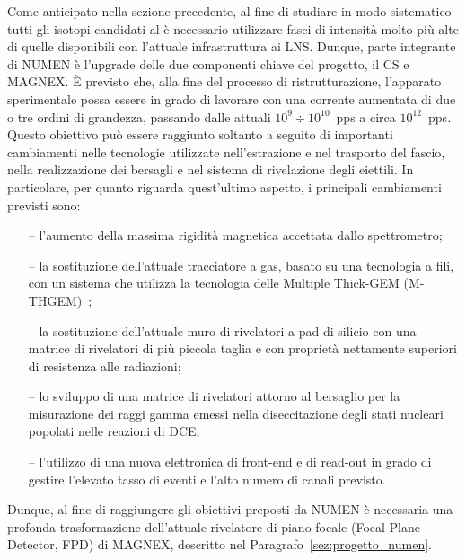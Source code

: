 Come anticipato nella sezione precedente, al fine di studiare in modo sistematico tutti gli isotopi candidati al \doppiobeta{} è necessario utilizzare fasci di intensità molto più alte di quelle disponibili con l'attuale infrastruttura ai LNS. Dunque, parte integrante di NUMEN è l'upgrade delle due componenti chiave del progetto, il CS e MAGNEX. 
È previsto che, alla fine del processo di ristrutturazione, l'apparato sperimentale possa essere in grado di lavorare con una corrente aumentata di due o tre ordini di grandezza, passando dalle attuali $10^{9} \div 10^{10}$~pps a circa $10^{12}$~pps.
Questo obiettivo può essere raggiunto soltanto a seguito di importanti cambiamenti nelle tecnologie utilizzate nell'estrazione e nel trasporto del fascio, nella realizzazione dei bersagli e nel sistema di rivelazione degli eiettili. 
In particolare, per quanto riguarda quest'ultimo aspetto, i principali cambiamenti previsti sono:
\begin{itemize}
	\item[--] l'aumento della massima rigidità magnetica accettata dallo spettrometro;
	\item[--] la sostituzione dell'attuale tracciatore a gas, basato su una tecnologia a fili, con un sistema che utilizza la tecnologia delle Multiple Thick-GEM (M-THGEM)~\cite{cortesi:rsi17};
	\item[--] la sostituzione dell'attuale muro di rivelatori a pad di silicio con una matrice di rivelatori di più piccola taglia e con proprietà nettamente superiori di resistenza alle radiazioni;
	\item[--] lo sviluppo di una matrice di rivelatori attorno al bersaglio per la misurazione dei raggi gamma emessi nella diseccitazione degli stati nucleari popolati nelle reazioni di DCE;
	\item[--] l'utilizzo di una nuova elettronica di front-end e di read-out in grado di gestire l'elevato tasso di eventi e l'alto numero di canali previsto.
\end{itemize}
Dunque, al fine di raggiungere gli obiettivi preposti da NUMEN è necessaria una profonda trasformazione dell'attuale rivelatore di piano focale (Focal Plane Detector, FPD) di MAGNEX, descritto nel Paragrafo~\ref{sez:progetto_numen}.


